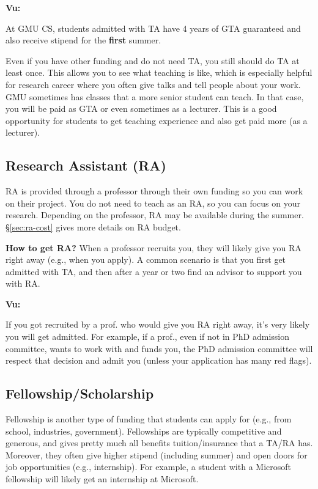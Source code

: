\documentclass[11pt]{article}
\newenvironment{commentbox}[1][]{
\small
    \begin{cbox}
    \textbf{#1} 
 }{
   \end{cbox}
}
\begin{document}
\begin{commentbox}[Vu:]
At GMU CS, students admitted with TA have  4 years of GTA guaranteed and also receive  stipend for the \textbf{first} summer.
\end{commentbox}

Even if you have other funding and do not need TA, you still should do TA at least once.  This allows you to see what teaching is like, which is especially helpful for research career where you often give talks and tell people about your work. GMU sometimes has classes that a more senior student can teach.  In that case, you will be paid as GTA or even sometimes as a lecturer.  This is a good opportunity for students to get teaching experience and also get paid more (as a lecturer).

\subsection{Research Assistant (RA)}
RA is provided through a professor through their own funding so you can work on their project.  
You do not need to teach as an RA, so you can focus on your research. Depending on the professor, RA may be available during the summer. \S\ref{sec:ra-cost} gives more details on RA budget.

\textbf{How to get RA?} When a professor recruits you, they will likely give you RA right away (e.g., when you apply).  A common scenario is that you first get admitted with TA, and then after a year or two find an advisor to support you with RA. 


\begin{commentbox}[Vu:]
If you got recruited by a prof. who would give you RA right away, it's very likely you will get admitted.  For example, if a prof., even if not in PhD admission committee, wants to work with and funds you, the PhD admission committee will respect that decision and admit you (unless your application has many red flags).
\end{commentbox}

\subsection{Fellowship/Scholarship}

Fellowship is another type of funding that students can apply for (e.g., from school, industries, government). Fellowships are typically competitive and generous, and gives pretty much all benefits tuition/insurance that a TA/RA has.  Moreover, they often give higher stipend (including summer) and open doors for job opportunities (e.g., internship).  For example, a student with a Microsoft fellowship will likely get an internship at Microsoft.  
\end{document}

